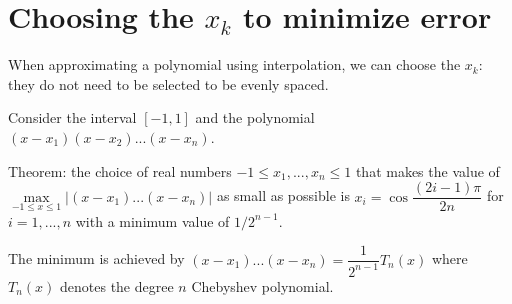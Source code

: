 \documentclass[12pt,letterpaper,noanswers]{exam}
\begin{document}
\section*{Choosing the $x_k$ to minimize error}

When approximating a polynomial using interpolation, we can choose the $x_k$: they do not need to be selected to be evenly spaced.

Consider the interval $[-1,1]$ and the polynomial $(x-x_1)(x-x_2)...(x-x_n)$.

Theorem: the choice of real numbers $-1 \leq x_1,...,x_n\leq 1$ that makes the value of $\max\limits_{-1\leq x\leq 1}\left\vert (x-x_1)...(x-x_n)\right\vert$ as small as possible is $x_i = \cos\dfrac{(2i-1)\pi}{2n}$ for $i=1,...,n$ with a minimum value of $1/2^{n-1}$.

The minimum is achieved by $(x-x_1)...(x-x_n) = \dfrac{1}{2^{n-1}}T_n(x)$ where $T_n(x)$ denotes the degree $n$ Chebyshev polynomial.
\end{document}
